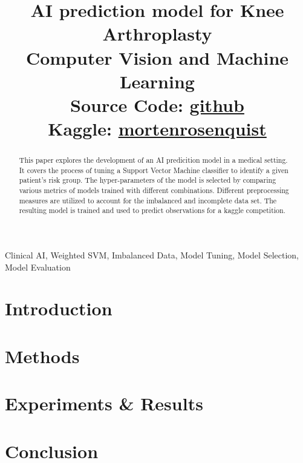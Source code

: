 \documentclass[conference]{IEEEtran}
\begin{document}
\title{AI prediction model for Knee Arthroplasty\\
{\LARGE Computer Vision and Machine Learning}\\
{\large Source Code: \href{https://github.com/mlRosenquist/au-mlr-computer-vision-and-ml/tree/master/project}{github}}\\
{\large Kaggle: \href{https://www.kaggle.com/mortenrosenquist} {mortenrosenquist}}
}

\author{
}

\maketitle

\begin{abstract}
This paper explores the development of an AI predicition model in a medical setting. It covers the process of tuning a Support Vector Machine classifier to identify a given patient's risk group. The hyper-parameters of the model is selected by comparing various metrics of models trained with different combinations. Different preprocessing measures are utilized to account for the imbalanced and incomplete data set. The resulting model is trained and used to predict observations for a kaggle competition.
\end{abstract}

\begin{IEEEkeywords}
  Clinical AI, Weighted SVM, Imbalanced Data, Model Tuning, Model Selection, Model Evaluation
\end{IEEEkeywords}

\section{Introduction}


\section{Methods}


\section{Experiments \& Results}


\section{Conclusion}


\printbibliography[title={References}]
\end{document}
